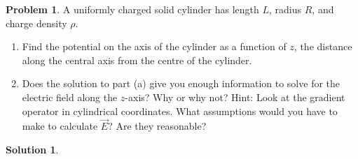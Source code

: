 \documentclass[10pt]{article}
\theoremstyle{definition}
\newtheorem{problem}{Problem}
\newtheorem{soln}{Solution}
\begin{document}
\begin{problem}
A uniformly charged solid cylinder has length $L$, radius $R$, and charge density $\rho$.
\begin{enumerate}[label=(\alph*)]
  \item Find the potential on the axis of the cylinder as a function of $z$, the distance along the central axis from
the centre of the cylinder.
  \item Does the solution to part (a) give you enough information to solve for the electric field along the $z$-axis?
Why or why not? Hint: Look at the gradient operator in cylindrical coordinates. What assumptions would
you have to make to calculate $\vec{E}$? Are they reasonable?
\end{enumerate}
\end{problem}
\begin{soln}
\end{soln}
\end{document}
